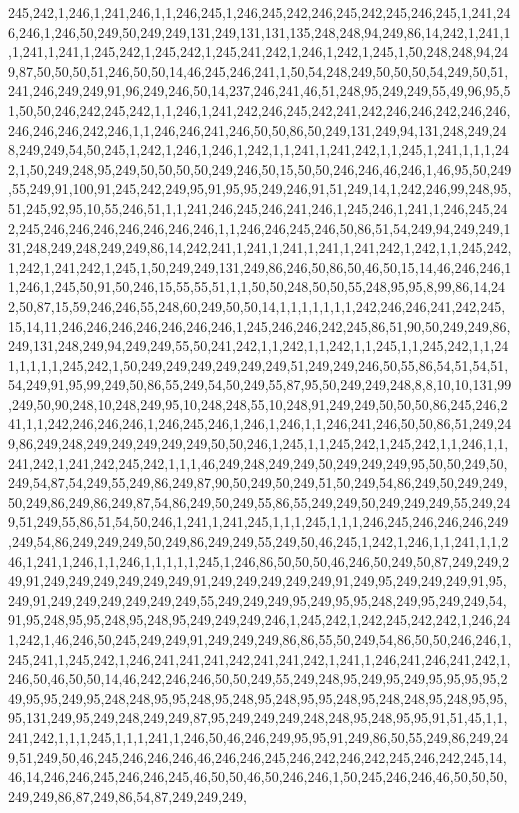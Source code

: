 245,242,1,246,1,241,246,1,1,246,245,1,246,245,242,246,245,242,245,246,245,1,241,246,246,1,246,50,249,50,249,249,131,249,131,131,135,248,248,94,249,86,14,242,1,241,1,1,241,1,241,1,245,242,1,245,242,1,245,241,242,1,246,1,242,1,245,1,50,248,248,94,249,87,50,50,50,51,246,50,50,14,46,245,246,241,1,50,54,248,249,50,50,50,54,249,50,51,241,246,249,249,91,96,249,246,50,14,237,246,241,46,51,248,95,249,249,55,49,96,95,51,50,50,246,242,245,242,1,1,246,1,241,242,246,245,242,241,242,246,246,242,246,246,246,246,246,242,246,1,1,246,246,241,246,50,50,86,50,249,131,249,94,131,248,249,248,249,249,54,50,245,1,242,1,246,1,246,1,242,1,1,241,1,241,242,1,1,245,1,241,1,1,1,242,1,50,249,248,95,249,50,50,50,50,249,246,50,15,50,50,246,246,46,246,1,46,95,50,249,55,249,91,100,91,245,242,249,95,91,95,95,249,246,91,51,249,14,1,242,246,99,248,95,51,245,92,95,10,55,246,51,1,1,241,246,245,246,241,246,1,245,246,1,241,1,246,245,242,245,246,246,246,246,246,246,246,1,1,246,246,245,246,50,86,51,54,249,94,249,249,131,248,249,248,249,249,86,14,242,241,1,241,1,241,1,241,1,241,242,1,242,1,1,245,242,1,242,1,241,242,1,245,1,50,249,249,131,249,86,246,50,86,50,46,50,15,14,46,246,246,11,246,1,245,50,91,50,246,15,55,55,51,1,1,50,50,248,50,50,55,248,95,95,8,99,86,14,242,50,87,15,59,246,246,55,248,60,249,50,50,14,1,1,1,1,1,1,1,242,246,246,241,242,245,15,14,11,246,246,246,246,246,246,246,1,245,246,246,242,245,86,51,90,50,249,249,86,249,131,248,249,94,249,249,55,50,241,242,1,1,242,1,1,242,1,1,245,1,1,245,242,1,1,241,1,1,1,1,245,242,1,50,249,249,249,249,249,249,51,249,249,246,50,55,86,54,51,54,51,54,249,91,95,99,249,50,86,55,249,54,50,249,55,87,95,50,249,249,248,8,8,10,10,131,99,249,50,90,248,10,248,249,95,10,248,248,55,10,248,91,249,249,50,50,50,86,245,246,241,1,1,242,246,246,246,1,246,245,246,1,246,1,246,1,1,246,241,246,50,50,86,51,249,249,86,249,248,249,249,249,249,249,50,50,246,1,245,1,1,245,242,1,245,242,1,1,246,1,1,241,242,1,241,242,245,242,1,1,1,46,249,248,249,249,50,249,249,249,95,50,50,249,50,249,54,87,54,249,55,249,86,249,87,90,50,249,50,249,51,50,249,54,86,249,50,249,249,50,249,86,249,86,249,87,54,86,249,50,249,55,86,55,249,249,50,249,249,249,55,249,249,51,249,55,86,51,54,50,246,1,241,1,241,245,1,1,1,245,1,1,1,246,245,246,246,246,249,249,54,86,249,249,249,50,249,86,249,249,55,249,50,46,245,1,242,1,246,1,1,241,1,1,246,1,241,1,246,1,1,246,1,1,1,1,1,245,1,246,86,50,50,50,46,246,50,249,50,87,249,249,249,91,249,249,249,249,249,249,91,249,249,249,249,249,91,249,95,249,249,249,91,95,249,91,249,249,249,249,249,249,55,249,249,249,95,249,95,95,248,249,95,249,249,54,91,95,248,95,95,248,95,248,95,249,249,249,246,1,245,242,1,242,245,242,242,1,246,241,242,1,46,246,50,245,249,249,91,249,249,249,86,86,55,50,249,54,86,50,50,246,246,1,245,241,1,245,242,1,246,241,241,241,242,241,241,242,1,241,1,246,241,246,241,242,1,246,50,46,50,50,14,46,242,246,246,50,50,249,55,249,248,95,249,95,249,95,95,95,95,249,95,95,249,95,248,248,95,95,248,95,248,95,248,95,95,248,95,248,248,95,248,95,95,95,131,249,95,249,248,249,249,87,95,249,249,249,248,248,95,248,95,95,91,51,45,1,1,241,242,1,1,1,245,1,1,1,241,1,246,50,46,246,249,95,95,91,249,86,50,55,249,86,249,249,51,249,50,46,245,246,246,246,46,246,246,245,246,242,246,242,245,246,242,245,14,46,14,246,246,245,246,246,245,46,50,50,46,50,246,246,1,50,245,246,246,46,50,50,50,249,249,86,87,249,86,54,87,249,249,249,